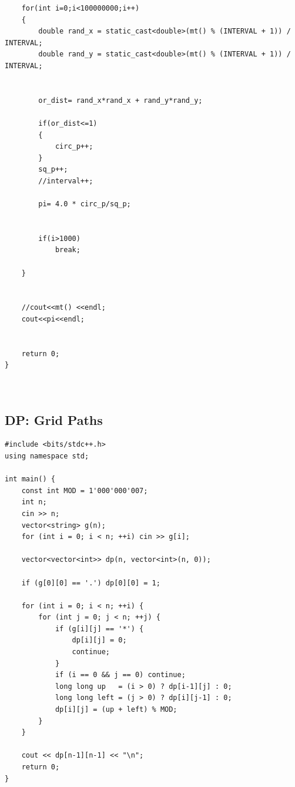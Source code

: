 \documentclass[a4paper,10pt,oneside]{article}
\begin{document}
\begin{multicols*}{\COLS}
\begin{lstlisting}
	for(int i=0;i<100000000;i++)
	{
		double rand_x = static_cast<double>(mt() % (INTERVAL + 1)) / INTERVAL;
        double rand_y = static_cast<double>(mt() % (INTERVAL + 1)) / INTERVAL;

		
		or_dist= rand_x*rand_x + rand_y*rand_y;

		if(or_dist<=1)
		{
			circ_p++;
		}
		sq_p++;
		//interval++;

		pi= 4.0 * circ_p/sq_p;
		

		if(i>1000)
			break;

	}


	//cout<<mt() <<endl;
	cout<<pi<<endl;


	return 0;
}



\end{lstlisting}
\subsection{DP: Grid Paths}
\begin{lstlisting}
#include <bits/stdc++.h>
using namespace std;

int main() {
    const int MOD = 1'000'000'007;
    int n;
    cin >> n;
    vector<string> g(n);
    for (int i = 0; i < n; ++i) cin >> g[i];

    vector<vector<int>> dp(n, vector<int>(n, 0));

    if (g[0][0] == '.') dp[0][0] = 1;

    for (int i = 0; i < n; ++i) {
        for (int j = 0; j < n; ++j) {
            if (g[i][j] == '*') { 
                dp[i][j] = 0;
                continue;
            }
            if (i == 0 && j == 0) continue;
            long long up   = (i > 0) ? dp[i-1][j] : 0;
            long long left = (j > 0) ? dp[i][j-1] : 0;
            dp[i][j] = (up + left) % MOD;
        }
    }

    cout << dp[n-1][n-1] << "\n";
    return 0;
}


\end{lstlisting}

\end{multicols*}
\end{document}

